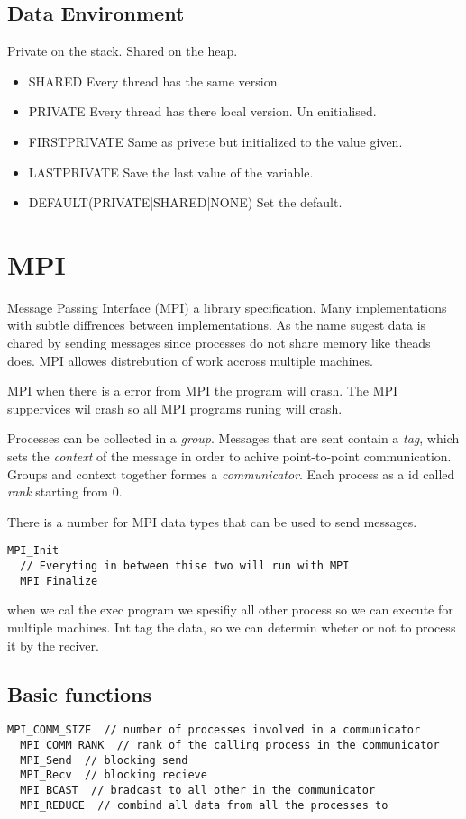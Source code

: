 \subsection{Data Environment}
Private on the stack. Shared on the heap.
\begin{itemize}
  \item SHARED\: Every thread has the same version.
  \item PRIVATE\: Every thread has there local version. Un enitialised.
  \item FIRSTPRIVATE\: Same as privete but initialized to the value given.
  \item LASTPRIVATE\: Save the last value of the variable.
  \item DEFAULT(PRIVATE|SHARED|NONE)\: Set the default.
\end{itemize}

\section{MPI}
Message Passing Interface (MPI) a library specification. Many implementations with subtle
diffrences between implementations. As the name sugest data is chared by sending messages
since processes do not share memory like theads does. MPI allowes distrebution of work accross
multiple machines.


MPI when there is a error from MPI the program will crash.
The MPI suppervices wil crash so all MPI programs runing will crash.

Processes can be collected in a \textit{group}. Messages that are sent contain a \textit{tag},
which sets the \textit{context} of the message in order to achive point-to-point communication.
Groups and context together formes a \textit{communicator}. Each process as a id called \textit{rank} starting from 0. 

There is a number for MPI data types that can be used to send messages.

\begin{BVerbatim}[baseline=c]
  MPI_Init
  // Everyting in between thise two will run with MPI
  MPI_Finalize
\end{BVerbatim}

when we cal the exec program we spesifiy all other process so we can execute for multiple machines.
Int tag the data, so we can determin wheter or not to process it by the reciver.

\subsection{Basic functions}
\begin{BVerbatim}[baseline=c]
  MPI_COMM_SIZE  // number of processes involved in a communicator
  MPI_COMM_RANK  // rank of the calling process in the communicator
  MPI_Send  // blocking send
  MPI_Recv  // blocking recieve
  MPI_BCAST  // bradcast to all other in the communicator
  MPI_REDUCE  // combind all data from all the processes to 
\end{BVerbatim}

